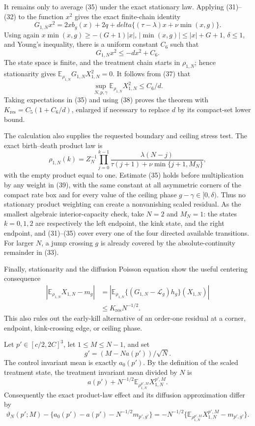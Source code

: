 It remains only to average (35) under the exact stationary law.  Applying (31)--(32) to the function \(x^2\) gives the exact finite-chain identity
\[
 G_{1,N}x^2
 =2xb_g(x)+2q+delta\{(\tau-\lambda)x+\nu\min(x,g)\}.          \tag{36}
\]
Using again \(x\min(x,g)\geq-(G+1)|x|\), \(|\min(x,g)|\leq|x|+G+1\), \(\delta\leq1\), and Young's inequality, there is a uniform constant \(C_6\) such that
\[
 G_{1,N}x^2\leq-dx^2+C_6.                                      \tag{37}
\]
The state space is finite, and the treatment chain starts in \(\rho_{1,N}\); hence stationarity gives \(\mathbb E_{\rho_{1,N}}G_{1,N}X_{1,N}^2=0\).  It follows from (37) that
\[
 \sup_{N,p,\gamma}\mathbb E_{\rho_{1,N}}X_{1,N}^2\leq C_6/d. \tag{38}
\]
Taking expectations in (35) and using (38) proves the theorem with
\(K_{\mathrm{res}}=C_5(1+C_6/d)\), enlarged if necessary to replace \(d\) by its compact-set lower bound.

The calculation also supplies the requested boundary and ceiling stress test.  The exact birth--death product law is
\[
 \rho_{1,N}(k)=Z_N^{-1}\prod_{j=0}^{k-1}
 \frac{\lambda(N-j)}{\tau(j+1)+\nu\min\{j+1,M_N\}},            \tag{39}
\]
with the empty product equal to one.  Estimate (35) holds before multiplication by any weight in (39), with the same constant at all asymmetric corners of the compact rate box and for every value of the ceiling phase \(g-\gamma\in[0,\delta)\).  Thus no stationary product weighting can create a nonvanishing scaled residual.  As the smallest algebraic interior-capacity check, take \(N=2\) and \(M_N=1\): the states \(k=0,1,2\) are respectively the left endpoint, the kink state, and the right endpoint, and (31)--(35) cover every one of the four directed available transitions.  For larger \(N\), a jump crossing \(g\) is already covered by the absolute-continuity remainder in (33).

Finally, stationarity and the diffusion Poisson equation show the useful centering consequence
\[
 \begin{split}
 \left|\mathbb E_{\rho_{1,N}}X_{1,N}-m_g\right|
 &=\left|\mathbb E_{\rho_{1,N}}
 \{(G_{1,N}-\mathcal L_g)h_g\}(X_{1,N})\right|\\
 &\leq K_{\mathrm{res}}N^{-1/2}.                               
 \end{split}                                                     \tag{40}
\]
This also rules out the early-kill alternative of an order-one residual at a corner, endpoint, kink-crossing edge, or ceiling phase.

Let \(p'\in[c/2,2C]^3\), let \(1\leq M\leq N-1\), and set
\[
 g'=(M-Na(p'))/\sqrt N.
\]
The control invariant mean is exactly \(a_0(p')\).  By the definition of the scaled treatment state, the treatment invariant mean divided by \(N\) is
\[
 a(p')+N^{-1/2}\mathbb E_{\rho_{1,N}^{p',M}}X_{1,N}^{p',M}.
\]
Consequently the exact product-law effect and its diffusion approximation differ by
\[
 \vartheta_N(p';M)-\{a_0(p')-a(p')-N^{-1/2}m_{p',g'}\}
 =-N^{-1/2}\{\mathbb E_{\rho_{1,N}^{p',M}}X_{1,N}^{p',M}-m_{p',g'}\}. \tag{41}
\]


